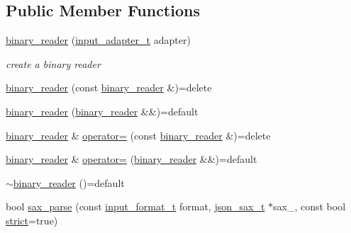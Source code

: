 \subsection*{Public Member Functions}
\begin{DoxyCompactItemize}
\item 
\hyperlink{classnlohmann_1_1detail_1_1binary__reader_aed84f0302eb232d3b69f7653bef2337a}{binary\+\_\+reader} (\hyperlink{namespacenlohmann_1_1detail_ae132f8cd5bb24c5e9b40ad0eafedf1c2}{input\+\_\+adapter\+\_\+t} adapter)
\begin{DoxyCompactList}\small\item\em create a binary reader \end{DoxyCompactList}\item 
\hyperlink{classnlohmann_1_1detail_1_1binary__reader_aacbece7dfa1698dfb3f22c90922d7244}{binary\+\_\+reader} (const \hyperlink{classnlohmann_1_1detail_1_1binary__reader}{binary\+\_\+reader} \&)=delete
\item 
\hyperlink{classnlohmann_1_1detail_1_1binary__reader_a254d91b10c2f4579634b6f70ffc1ef16}{binary\+\_\+reader} (\hyperlink{classnlohmann_1_1detail_1_1binary__reader}{binary\+\_\+reader} \&\&)=default
\item 
\hyperlink{classnlohmann_1_1detail_1_1binary__reader}{binary\+\_\+reader} \& \hyperlink{classnlohmann_1_1detail_1_1binary__reader_a87826b833ee7fec146c97233bb0f6ab8}{operator=} (const \hyperlink{classnlohmann_1_1detail_1_1binary__reader}{binary\+\_\+reader} \&)=delete
\item 
\hyperlink{classnlohmann_1_1detail_1_1binary__reader}{binary\+\_\+reader} \& \hyperlink{classnlohmann_1_1detail_1_1binary__reader_a7ba0e555da725a2efa17048e67aec9a9}{operator=} (\hyperlink{classnlohmann_1_1detail_1_1binary__reader}{binary\+\_\+reader} \&\&)=default
\item 
\hyperlink{classnlohmann_1_1detail_1_1binary__reader_a18e0a63e22dbdad5f6964276b81b813a}{$\sim$binary\+\_\+reader} ()=default
\item 
bool \hyperlink{classnlohmann_1_1detail_1_1binary__reader_ab94a54d6e595c2620b07589cf4116256}{sax\+\_\+parse} (const \hyperlink{namespacenlohmann_1_1detail_aa554fc6a11519e4f347deb25a9f0db40}{input\+\_\+format\+\_\+t} format, \hyperlink{classnlohmann_1_1detail_1_1binary__reader_a43c5dc6a3219f64a7824d7ba9c7b14ae}{json\+\_\+sax\+\_\+t} $\ast$sax\+\_\+, const bool \hyperlink{namespacenlohmann_1_1detail_a5a76b60b26dc8c47256a996d18d967dfa2133fd717402a7966ee88d06f9e0b792}{strict}=true)
\end{DoxyCompactItemize}

